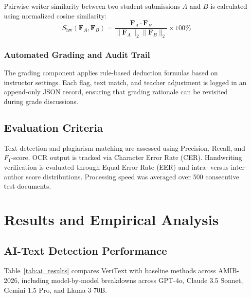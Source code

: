 \documentclass[conference]{IEEEtran}
\begin{document}
Pairwise writer similarity between two student submissions $A$ and $B$ is calculated using normalized cosine similarity:
\begin{equation}
S_{\text{hw}}(\mathbf{F}_A, \mathbf{F}_B) = \frac{\mathbf{F}_A \cdot \mathbf{F}_B}{\|\mathbf{F}_A\|_2 \|\mathbf{F}_B\|_2} \times 100\%
\end{equation}

\subsubsection{Automated Grading and Audit Trail}
The grading component applies rule-based deduction formulas based on instructor settings. Each flag, text match, and teacher adjustment is logged in an append-only JSON record, ensuring that grading rationale can be revisited during grade discussions.

\subsection{Evaluation Criteria}
Text detection and plagiarism matching are assessed using Precision, Recall, and $F_1$-score. OCR output is tracked via Character Error Rate (CER). Handwriting verification is evaluated through Equal Error Rate (EER) and intra- versus inter-author score distributions. Processing speed was averaged over 500 consecutive test documents.

\section{Results and Empirical Analysis}

\subsection{AI-Text Detection Performance}
Table~\ref{tab:ai_results} compares VeriText with baseline methods across AMIB-2026, including model-by-model breakdowns across GPT-4o, Claude 3.5 Sonnet, Gemini 1.5 Pro, and Llama-3-70B.
\end{document}
